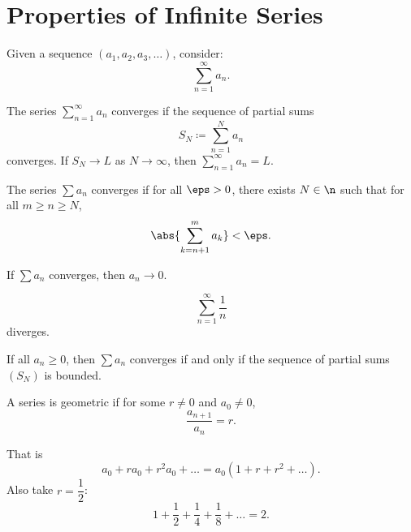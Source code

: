 
\section{Properties of Infinite Series}


\begin{definition}
    Given a sequence $(a_1,a_2,a_3,\ldots)$, consider:
    \[
        \sum_{n=1}^\infty a_n.
    \]
\end{definition}

\begin{definition}
    The series $\sum_{n=1}^\infty a_n$ converges if the sequence of partial sums
    \[
        S_N \coloneqq \sum_{n=1}^N a_n
    \]
    converges.
    If $S_N\to L$ as $N\to \infty$, then $\sum_{n=1}^\infty a_n = L$.
\end{definition}

\begin{definition}
    The series $\sum a_n$ converges if for all $\eps > 0$, there exists $N\in\n$ such that for all $m\geq n\geq N$,
    \[
        \abs{\sum_{k=n+1}^m a_k} < \eps.
    \]
\end{definition}

\begin{theorem*}{
    If $\sum a_n$ converges, then $a_n\to 0$.
}
\end{theorem*}

\begin{definition}
    \[
        \sum_{n=1}^\infty \dfrac{1}{n}
    \]
    diverges.
\end{definition}

\begin{theorem*}{
    If all $a_n\geq 0$, then $\sum a_n$ converges if and only if the sequence of partial sums $(S_N)$ is bounded.
}
\end{theorem*}

\begin{definition}
    A series is geometric if for some $r\neq 0$ and $a_0\neq 0$,
    \[
        \dfrac{a_{n+1}}{a_n} = r.
    \]
\end{definition}

\begin{remark}
    That is
    \[
        a_0 + ra_0 + r^2 a_0 + \ldots = a_0(1 + r + r^2 + \ldots).
    \]
    Also take $r = \dfrac{1}{2}$:
    \[
        1 + \dfrac{1}{2} + \dfrac{1}{4} + \dfrac{1}{8} + \ldots = 2.
    \]
\end{remark}

